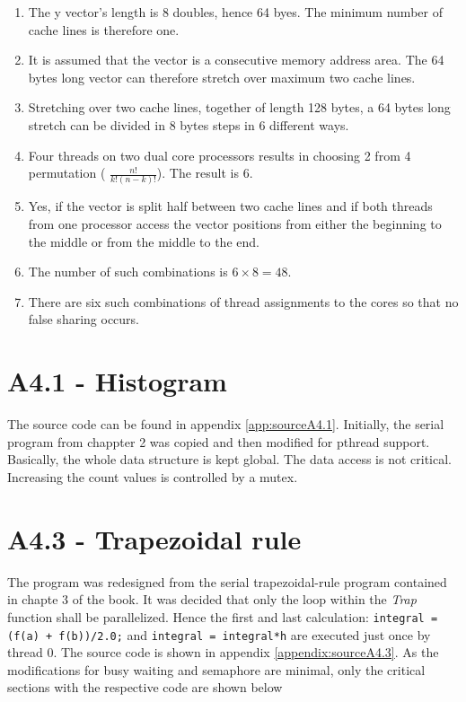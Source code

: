 \documentclass[a4paper,11pt,twoside]{article}
\begin{document}
\begin{enumerate}[label={\alph*)}]
\item The y vector's length is 8 doubles, hence 64 byes. The minimum number of cache lines is therefore one.

\item It is assumed that the vector is a consecutive memory address area. The 64 bytes long vector can therefore stretch over maximum two cache lines.

\item Stretching over two cache lines, together of length 128 bytes, a 64 bytes long stretch can be divided in 8 bytes steps in 6 different ways. 

\item Four threads on two dual core processors results in choosing 2 from 4 permutation ( $\frac{n!}{k!(n-k)!}$). The result is 6.
\item Yes, if the vector is split half between two cache lines and if both threads from one processor access the vector positions from either the beginning to the middle or from the middle to the end.

\item The number of such combinations is $6 \times 8 = 48$.

\item There are six such combinations of thread assignments to the cores so that no false sharing occurs.

\end{enumerate}

\section{A4.1 - Histogram}
The source code can be found in appendix \ref{app:sourceA4.1}. Initially, the serial program from chappter 2 was copied and then modified for pthread support. Basically, the whole data structure is kept global. The data access is not critical. Increasing the count values is controlled by a mutex.

\section{A4.3 - Trapezoidal rule}
The program was redesigned from the serial trapezoidal-rule program contained in chapte 3 of the book. It was decided that only the loop within the \textit{Trap} function shall be parallelized. Hence the first and last calculation: \verb!integral = (f(a) + f(b))/2.0;! and \verb!integral = integral*h! are executed just once by thread 0. The source code is shown in appendix \ref{appendix:sourceA4.3}. As the modifications for busy waiting and semaphore are minimal, only the critical sections with the respective code are shown below
\end{document}
